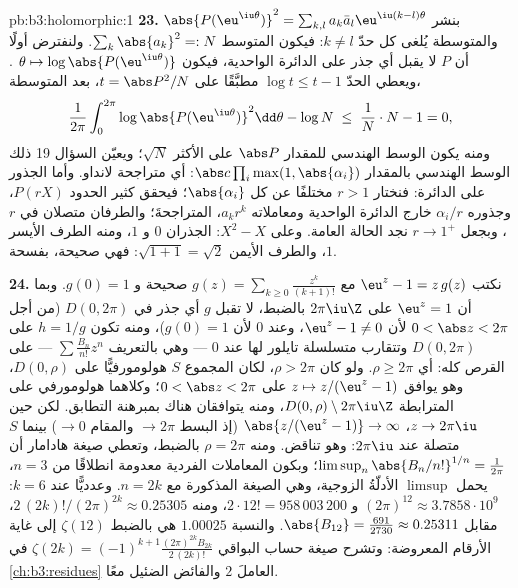 \begin{solution}{pb:b3:holomorphic:1}
\textbf{23.} بنشر $\abs{P(\eu^{\iu\theta})}^2 = \sum_{k,l}a_k\bar a_l
\eu^{\iu(k-l)\theta}$ والمتوسطة يُلغى كل حدّ $k \neq
l$: فيكون
المتوسط $\sum_k\abs{a_k}^2 =: N$. ولنفترض أولًا أن $P$ لا يقبل أي جذر على الدائرة
الواحدية، فيكون $\theta \mapsto
\log\abs{P(\eu^{\iu\theta})}$ . ويعطي الحدّ $\log
t \leq t - 1$ مطبَّقًا على
$t = \abs P^2/N$، بعد المتوسطة،
\[
\frac1{2\pi}\int_0^{2\pi}\log\abs{P(\eu^{\iu\theta})}^2
\dd\theta - \log N
\;\leq\; \frac1N\cdot N - 1 = 0,
\]
ومنه يكون الوسط الهندسي للمقدار $\abs P$ على الأكثر $\sqrt N$؛
ويعيّن السؤال 19 ذلك الوسط الهندسي بالمقدار $\abs c\prod_i\max(1, \abs{\alpha_i})$: أي متراجحة
لانداو. وأما الجذور على الدائرة: فنختار $r > 1$ مختلفًا عن كل
$\abs{\alpha_i}$؛ فيحقق كثير الحدود $P(rX)$، وجذوره $\alpha_i/r$ خارج
الدائرة الواحدية ومعاملاته $a_kr^k$، المتراجحةَ؛ والطرفان
متصلان في $r$، وبجعل $r \to 1^+$ نجد الحالة العامة. وعلى
$X^2 -
X$: الجذران $0$ و $1$، ومنه الطرف الأيسر $1$، والطرف
الأيمن $\sqrt{1 + 1} = \sqrt2$: فهي صحيحة، بفسحة.

\textbf{24.} نكتب $\eu^z - 1 = z\,g(z)$ مع $g(z) =
\sum_{k\geq0}\frac{z^k}{(k+1)!}$ صحيحة و $g(0) = 1$. وبما
أن $\eu^z = 1$ على $2\pi\iu\Z$ بالضبط، لا تقبل $g$ أي جذر في
$D(0, 2\pi)$ (من أجل $0 < \abs z < 2\pi$ لأن $\eu^z - 1
\neq 0$، وعند $0$ لأن
$g(0) = 1$)، ومنه تكون $h = 1/g$  على $D(0,2\pi)$
وتتقارب متسلسلة تايلور لها عند $0$ --- وهي بالتعريف $\sum\frac{B_n}{n!}z^n$ ---
على القرص كله: أي $\rho \geq 2\pi$. ولو كان $\rho > 2\pi$، لكان
المجموع $S$ هولومورفيًّا على $D(0,\rho)$، وهو يوافق $z
\mapsto z/(\eu^z - 1)$ على
$0 < \abs z < 2\pi$؛ وكلاهما هولومورفي على  المترابطة
$D(0,\rho) \setminus
2\pi\iu\Z$، ومنه يتوافقان هناك بمبرهنة التطابق. لكن حين
$z \to 2\pi\iu$، $\abs{z/(\eu^z - 1)} \to \infty$ (إذ البسط $\to 2\pi$ والمقام $\to 0$)
بينما $S$ متصلة عند $2\pi\iu$: وهو تناقض. ومنه $\rho = 2\pi$
بالضبط، وتعطي صيغة هادامار أن $\limsup_n\abs{B_n/n!}^{1/n} = \frac1{2\pi}$؛ وبكون المعاملات الفردية
معدومة انطلاقًا من $n = 3$، يحمل $\limsup$ الأدلّةُ الزوجية،
وهي الصيغة المذكورة مع $n = 2k$. وعدديًّا عند $k = 6$: $(2\pi)^{12} \approx
3.7858\cdot10^9$
و $2\cdot12! = 958\,003\,200$، ومنه $2\,(2k)!/(2\pi)^{2k} \approx 0.25305$، مقابل $\abs{B_{12}} = \frac{691}{2730} \approx 0.25311$. والنسبة $1.00025$ هي
بالضبط $\zeta(12)$ إلى غاية الأرقام المعروضة: وتشرح صيغة حساب
البواقي $\zeta(2k) =
(-1)^{k+1}\frac{(2\pi)^{2k}B_{2k}}{2\,(2k)!}$ في \cref{ch:b3:residues} العاملَ $2$ والفائض الضئيل معًا.


\end{solution}

